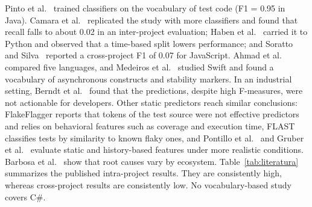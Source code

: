  Pinto et al.~\cite{pinto2020vocabulary} trained classifiers on the vocabulary of test code (F1 = 0.95 in Java). Camara et al.~\cite{camara2021revisiting} replicated the study with more classifiers and found that recall falls to about 0.02 in an inter-project evaluation; Haben et al.~\cite{haben2021replication} carried it to Python and observed that a time-based split lowers performance; and Soratto and Silva~\cite{soratto2023vocabulary} reported a cross-project F1 of 0.07 for JavaScript. Ahmad et al.~\cite{ahmad2025understanding} compared five languages, and Medeiros et al.~\cite{medeiros2026vocabulary} studied Swift and found a vocabulary of asynchronous constructs and stability markers. In an industrial setting, Berndt et al.~\cite{berndt2023vocabulary} found that the predictions, despite high F-measures, were not actionable for developers. Other static predictors reach similar conclusions: FlakeFlagger \cite{alshammari2021flakeflagger} reports that tokens of the test source were not effective predictors and relies on behavioral features such as coverage and execution time, FLAST \cite{verdecchia2021know} classifies tests by similarity to known flaky ones, and Pontillo et al.~\cite{pontillo2022static} and Gruber et al.~\cite{gruber2023practical} evaluate static and history-based features under more realistic conditions. Barbosa et al.~\cite{barbosa2023test} show that root causes vary by ecosystem.  Table~\ref{tab:literatura} summarizes the published intra-project results. They are consistently high, whereas cross-project results are consistently low. No vocabulary-based study covers C\#.


